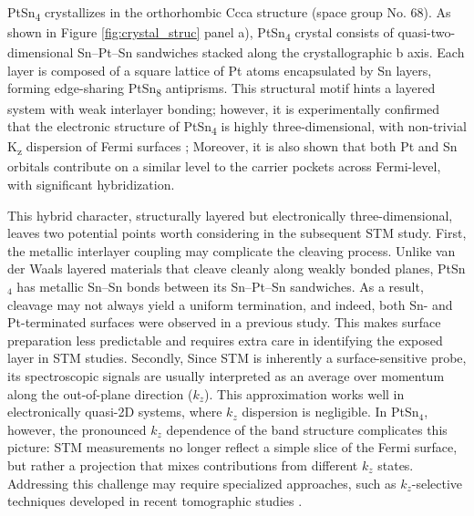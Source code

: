 PtSn\textsubscript{4} crystallizes in the orthorhombic Ccca structure (space group No. 68). As shown in Figure \ref{fig:crystal_struc} panel a), PtSn\textsubscript{4} crystal consists of quasi-two-dimensional Sn–Pt–Sn sandwiches stacked along the crystallographic b axis. Each layer is composed of a square lattice of Pt atoms encapsulated by Sn layers, forming edge-sharing PtSn\textsubscript{8} antiprisms. This structural motif hints a layered system with weak interlayer bonding; however, it is experimentally confirmed that the electronic structure of PtSn\textsubscript{4} is highly three-dimensional, with non-trivial K\textsubscript{z} dispersion of Fermi surfaces  \cite{wuDiracNodeArcs2016}\cite{linUltrafastCarrierRelaxation2024}\cite{inamdarQuantumOscillationsUltra2013a}\cite{munMagneticFieldEffects2012}\cite{yaraSmallFermiSurfaces2018a}\cite{diazSemiclassicalOriginExtreme2024}; Moreover, it is also shown that both Pt and Sn orbitals contribute on a similar level to the carrier pockets across Fermi-level, with significant hybridization\cite{luoOriginExtremelyLarge2018}. 

This hybrid character, structurally layered but electronically three-dimensional, leaves two potential points worth considering in the subsequent \ac{STM} study. First, the metallic interlayer coupling may complicate the cleaving process. Unlike van der Waals layered materials that cleave cleanly along weakly bonded planes, PtSn$_4$ has metallic Sn–Sn bonds between its Sn–Pt–Sn sandwiches. As a result, cleavage may not always yield a uniform termination, and indeed, both Sn- and Pt-terminated surfaces were observed in a previous study\cite{liDiracNodalArc2019}. This makes surface preparation less predictable and requires extra care in identifying the exposed layer in STM studies. Secondly, Since \ac{STM} is inherently a surface-sensitive probe, its spectroscopic signals are usually interpreted as an average over momentum along the out-of-plane direction ($k_z$). This approximation works well in electronically quasi-2D systems, where $k_z$ dispersion is negligible. In PtSn$_4$, however, the pronounced $k_z$ dependence of the band structure complicates this picture: STM measurements no longer reflect a simple slice of the Fermi surface, but rather a projection that mixes contributions from different $k_z$ states. Addressing this challenge may require specialized approaches, such as $k_z$-selective techniques developed in recent tomographic studies \cite{marquesTomographicMappingHidden2021}.

